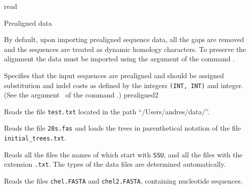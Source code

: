 \begin{command}{read}{}
\begin{arguments}
\begin{argumentgroup}{Prealigned data}
            \begin{statement}
                By default, upon importing prealigned sequence data, all the gaps are
                removed and the sequences are treated as dynamic homology characters.
                To preserve the alignment the data must be imported using the
                 argument of the command .
            \end{statement}
             
                {Specifies that the input sequences are prealigned and should be
                assigned substitution and indel costs as defined by the
                 integers \texttt{(INT, INT)} and  integer. (See the 
                argument~ 
                of the command .)}
                {prealigned2}
                
        \end{argumentgroup}
            
    \end{arguments}
            

    \begin{poyexamples}
    
            {Reads the file \texttt{test.txt} located in the path
            ``/Users/andres/data/''.}

            {Reads the file \texttt{28s.fas} and loads the trees in parenthetical notation
            of the file \texttt{initial\_trees.txt}.}

            {Reads all the files the names of which start with \texttt{SSU}, and all the
            files with the extension \texttt{.txt}. The types of the data files are determined
            automatically.}
        
            {Reads the files \texttt{chel.FASTA} and \texttt{chel2.FASTA}, containing nucleotide
            sequences.}


\end{poyexamples}
\end{command}
